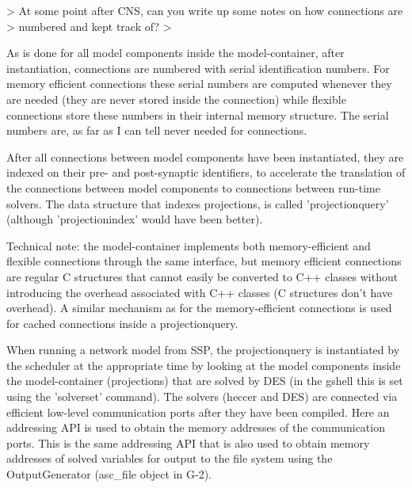\documentclass[12pt]{article}
\begin{document}
> At some point after CNS, can you write up some notes on how connections are
> numbered and kept track of?
>

As is done for all model components inside the model-container, after
instantiation, connections are numbered with serial identification
numbers.  For memory efficient connections these serial numbers are
computed whenever they are needed (they are never stored inside the
connection) while flexible connections store these numbers in their
internal memory structure.  The serial numbers are, as far as I can
tell never needed for connections.

After all connections between model components have been instantiated,
they are indexed on their pre- and post-synaptic identifiers, to
accelerate the translation of the connections between model components
to connections between run-time solvers.  The data structure that
indexes projections, is called 'projectionquery' (although
'projectionindex' would have been better).

Technical note: the model-container implements both memory-efficient
and flexible connections through the same interface, but memory
efficient connections are regular C structures that cannot easily be
converted to C++ classes without introducing the overhead associated
with C++ classes (C structures don't have overhead).  A similar
mechanism as for the memory-efficient connections is used for cached
connections inside a projectionquery.

When running a network model from SSP, the projectionquery is
instantiated by the scheduler at the appropriate time by looking at
the model components inside the model-container (projections) that are
solved by DES (in the gshell this is set using the 'solverset'
command).  The solvers (heccer and DES) are connected via efficient
low-level communication ports after they have been compiled.  Here an
addressing API is used to obtain the memory addresses of the
communication ports.  This is the same addressing API that is also
used to obtain memory addresses of solved variables for output to the
file system using the OutputGenerator (asc\_file object in G-2).
\end{document}
